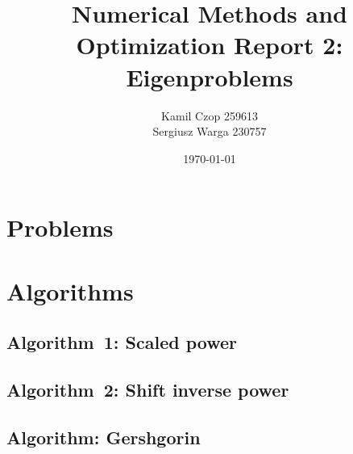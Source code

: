\documentclass[a4paper]{article}
\title{Numerical Methods and Optimization Report 2: Eigenproblems}
\author{Kamil Czop 259613\\Sergiusz Warga 230757}
\date{\today}
\begin{document}
\maketitle
\tableofcontents
\pagebreak

\section{Problems}





\clearpage

\section{Algorithms}
\subsection{Algorithm~1: Scaled power}%
\label{algorithm:1}

\subsection{Algorithm~2: Shift inverse power}%
\label{algorithm:2}

\subsection{Algorithm: Gershgorin}%
\label{algorithm:gershgorin}



\clearpage

\nocite{GoluVanl96,Zarowski,Zdunek}


\end{document}
